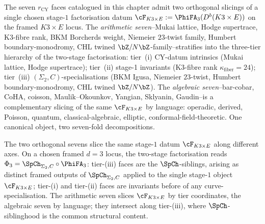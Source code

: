 \begin{remark}
\label{rem:cy-seven-face-two-orthogonal-sevens}
The seven $r_{\mathrm{CY}}$ faces catalogued in this chapter admit two
orthogonal slicings of a single chosen stage-$1$ factorisation datum
$\cF_{K3 \times E} := \PhiFA_3(D^b(K3 \times E))$ on the framed
$K3\times E$ locus.
The \emph{arithmetic seven}--Mukai lattice, Hodge supertrace, K3-fibre
rank, BKM Borcherds weight, Niemeier $23$-twist family,
Humbert boundary-monodromy, CHL twined $\bZ/N\bZ$-family--stratifies
into the three-tier hierarchy of the two-stage factorisation:
tier~(i) CY-datum intrinsics (Mukai lattice, Hodge supertrace);
tier~(ii) stage-1 invariants (K3-fibre rank
$\kappa_{\mathrm{fiber}} = 24$);
tier~(iii) $(\Sigma_2, C)$-specialisations (BKM Igusa,
Niemeier $23$-twist, Humbert boundary-monodromy, CHL twined $\bZ/N\bZ$).
The \emph{algebraic seven}--bar-cobar, CoHA, coisson, Maulik--Okounkov,
Yangian, Sklyanin, Gaudin--is a complementary slicing of the same
$\cF_{K3 \times E}$ by language: operadic, derived, Poisson, quantum,
classical-algebraic, elliptic, conformal-field-theoretic. One canonical
object, two seven-fold decompositions.
\end{remark}

\begin{remark}
\label{rem:cy-seven-face-tier-iii-siblings}
The two orthogonal sevens slice the same stage-$1$ datum
$\cF_{K3 \times E}$ along different axes. On a chosen framed $d=3$
locus, the two-stage factorisation reads
$\Phi_3 = \SpCh_{\Sigma_2, C} \circ \PhiFA_3$: tier-(iii) faces are the
$\SpCh$-siblings, arising as distinct framed outputs of
$\SpCh_{\Sigma_2, C}$ applied to the single stage-$1$ object
$\cF_{K3 \times E}$; tier-(i) and tier-(ii) faces are invariants before
of any curve-specialisation. The arithmetic seven slices
$\cF_{K3 \times E}$ by tier coordinates, the algebraic seven by
language; they intersect along tier-(iii), where $\SpCh$-siblinghood
is the common structural content.
\end{remark}

